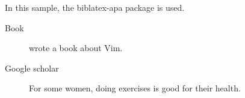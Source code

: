 \documentclass[a4paper]{article}
\begin{document}
In this sample, the \textsf{biblatex-apa} package is used.
\begin{description}
  \item[Book] \textcite{oualline2001} wrote a book about Vim.
  \item[Google scholar] For some women, doing exercises is good for their health. \parencite{asikainen2004exercise}
\end{description}
\printbibliography
\end{document}
